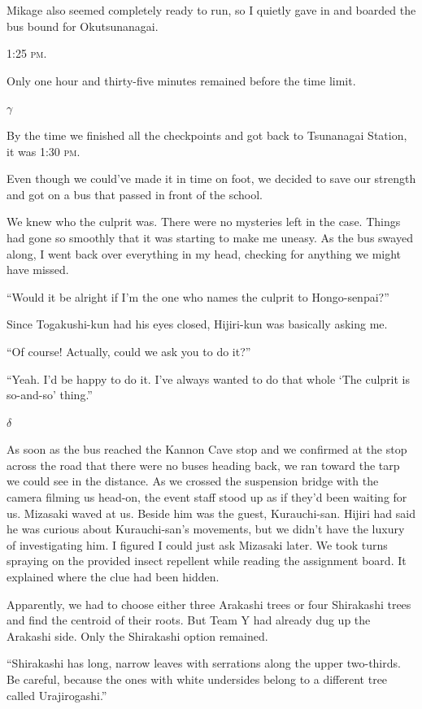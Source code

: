 \documentclass[
    a4paper,
    12pt,
    twoside,
    openany,
    UTF8,
    fontset=windows
]{ctexbook}
\begin{document}
Mikage also seemed completely ready to run, so I quietly gave in and boarded the bus bound for Okutsunanagai.

1:25 \textsc{pm}.

Only one hour and thirty-five minutes remained before the time limit.

$\gamma$

By the time we finished all the checkpoints and got back to Tsunanagai Station, it was 1:30 \textsc{pm}.

Even though we could've made it in time on foot, we decided to save our strength and got on a bus that passed in front of the school.

We knew who the culprit was. There were no mysteries left in the case. Things had gone so smoothly that it was starting to make me uneasy. As the bus swayed along, I went back over everything in my head, checking for anything we might have missed.

``Would it be alright if I'm the one who names the culprit to Hongo-senpai?''

Since Togakushi-kun had his eyes closed, Hijiri-kun was basically asking me.

``Of course! Actually, could we ask you to do it?''

``Yeah. I'd be happy to do it. I've always wanted to do that whole `The culprit is so-and-so' thing.''

$\delta$

As soon as the bus reached the Kannon Cave stop and we confirmed at the stop across the road that there were no buses heading back, we ran toward the tarp we could see in the distance. As we crossed the suspension bridge with the camera filming us head-on, the event staff stood up as if they'd been waiting for us. Mizasaki waved at us. Beside him was the guest, Kurauchi-san. Hijiri had said he was curious about Kurauchi-san's movements, but we didn't have the luxury of investigating him. I figured I could just ask Mizasaki later. We took turns spraying on the provided insect repellent while reading the assignment board. It explained where the clue had been hidden.

Apparently, we had to choose either three Arakashi trees or four Shirakashi trees and find the centroid of their roots. But Team Y had already dug up the Arakashi side. Only the Shirakashi option remained.

``Shirakashi has long, narrow leaves with serrations along the upper two-thirds. Be careful, because the ones with white undersides belong to a different tree called Urajirogashi.''
\end{document}

